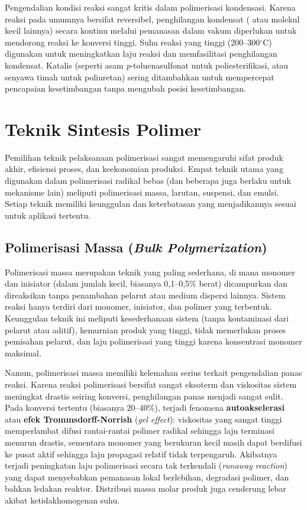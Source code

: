 \documentclass[12pt,a4paper,openany]{book}
\begin{document}
Pengendalian kondisi reaksi sangat kritis dalam polimerisasi kondensasi. Karena reaksi pada umumnya bersifat reversibel, penghilangan kondensat ( atau molekul kecil lainnya) secara kontinu melalui pemanasan dalam vakum diperlukan untuk mendorong reaksi ke konversi tinggi. Suhu reaksi yang tinggi (200--300$^\circ$C) digunakan untuk meningkatkan laju reaksi dan memfasilitasi penghilangan kondensat. Katalis (seperti asam \textit{p}-toluenasulfonat untuk poliesterifikasi, atau senyawa timah untuk poliuretan) sering ditambahkan untuk mempercepat pencapaian kesetimbangan tanpa mengubah posisi kesetimbangan.

\section{Teknik Sintesis Polimer}

Pemilihan teknik pelaksanaan polimerisasi sangat memengaruhi sifat produk akhir, efisiensi proses, dan keekonomian produksi. Empat teknik utama yang digunakan dalam polimerisasi radikal bebas (dan beberapa juga berlaku untuk mekanisme lain) meliputi polimerisasi massa, larutan, suspensi, dan emulsi. Setiap teknik memiliki keunggulan dan keterbatasan yang menjadikannya sesuai untuk aplikasi tertentu.

\subsection{Polimerisasi Massa (\textit{Bulk Polymerization})}

Polimerisasi massa merupakan teknik yang paling sederhana, di mana monomer dan inisiator (dalam jumlah kecil, biasanya 0,1--0,5\% berat) dicampurkan dan direaksikan tanpa penambahan pelarut atau medium dispersi lainnya. Sistem reaksi hanya terdiri dari monomer, inisiator, dan polimer yang terbentuk. Keunggulan teknik ini meliputi kesederhanaan sistem (tanpa kontaminasi dari pelarut atau aditif), kemurnian produk yang tinggi, tidak memerlukan proses pemisahan pelarut, dan laju polimerisasi yang tinggi karena konsentrasi monomer maksimal.

Namun, polimerisasi massa memiliki kelemahan serius terkait pengendalian panas reaksi. Karena reaksi polimerisasi bersifat sangat eksoterm dan viskositas sistem meningkat drastis seiring konversi, penghilangan panas menjadi sangat sulit. Pada konversi tertentu (biasanya 20--40\%), terjadi fenomena \textbf{autoakselerasi} atau \textbf{efek Trommsdorff-Norrish} (\textit{gel effect}): viskositas yang sangat tinggi memperlambat difusi rantai-rantai polimer radikal sehingga laju terminasi menurun drastis, sementara monomer yang berukuran kecil masih dapat berdifusi ke pusat aktif sehingga laju propagasi relatif tidak terpengaruh. Akibatnya terjadi peningkatan laju polimerisasi secara tak terkendali (\textit{runaway reaction}) yang dapat menyebabkan pemanasan lokal berlebihan, degradasi polimer, dan bahkan ledakan reaktor. Distribusi massa molar produk juga cenderung lebar akibat ketidakhomogenan suhu.
\end{document}
